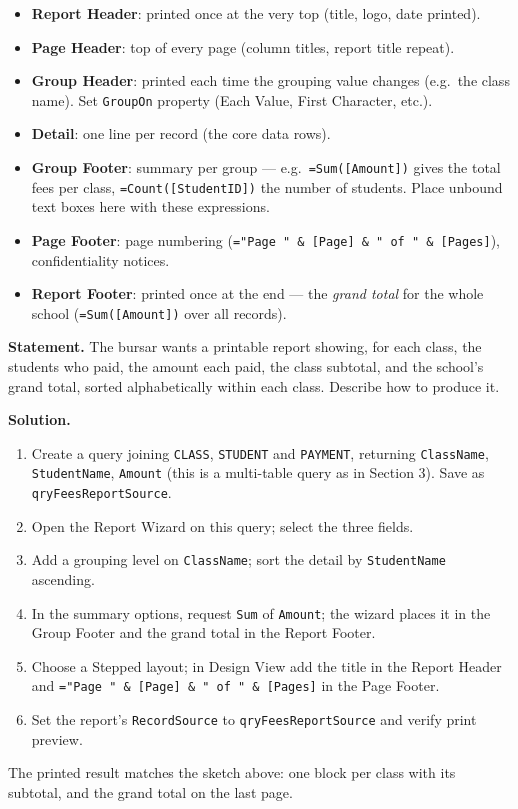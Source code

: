 \documentclass[11pt]{article}
\begin{document}
\begin{itemize}
\item \textbf{Report Header}: printed once at the very top (title, logo, date printed).
\item \textbf{Page Header}: top of every page (column titles, report title repeat).
\item \textbf{Group Header}: printed each time the grouping value changes (e.g.\ the class name). Set \texttt{GroupOn} property (Each Value, First Character, etc.).
\item \textbf{Detail}: one line per record (the core data rows).
\item \textbf{Group Footer}: summary per group --- e.g.\ \texttt{=Sum([Amount])} gives the total fees per class, \texttt{=Count([StudentID])} the number of students. Place unbound text boxes here with these expressions.
\item \textbf{Page Footer}: page numbering (\texttt{="Page " \& [Page] \& " of " \& [Pages]}), confidentiality notices.
\item \textbf{Report Footer}: printed once at the end --- the \emph{grand total} for the whole school (\texttt{=Sum([Amount])} over all records).
\end{itemize}

\begin{exoresolu}
\textbf{Statement.} The bursar wants a printable report showing, for each class, the students who paid, the amount each paid, the class subtotal, and the school's grand total, sorted alphabetically within each class. Describe how to produce it.

\tcblower
\textbf{Solution.}
\begin{enumerate}
\item Create a query joining \texttt{CLASS}, \texttt{STUDENT} and \texttt{PAYMENT}, returning \texttt{ClassName}, \texttt{StudentName}, \texttt{Amount} (this is a multi-table query as in Section 3). Save as \texttt{qryFeesReportSource}.
\item Open the Report Wizard on this query; select the three fields.
\item Add a grouping level on \texttt{ClassName}; sort the detail by \texttt{StudentName} ascending.
\item In the summary options, request \texttt{Sum} of \texttt{Amount}; the wizard places it in the Group Footer and the grand total in the Report Footer.
\item Choose a Stepped layout; in Design View add the title in the Report Header and \texttt{="Page " \& [Page] \& " of " \& [Pages]} in the Page Footer.
\item Set the report's \texttt{RecordSource} to \texttt{qryFeesReportSource} and verify print preview.
\end{enumerate}
The printed result matches the sketch above: one block per class with its subtotal, and the grand total on the last page.
\end{exoresolu}
\end{document}
